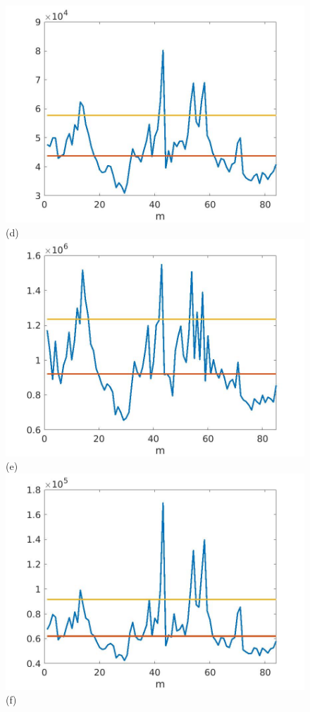 \documentclass[journal]{IEEEtran}
\begin{document}
\begin{figure}[htp!]
\includegraphics[scale=.12]{../../figs/consecdif_J2_euclid_squared_meandev}(d)\\
\includegraphics[scale=.12]{../../figs/J3_euclid_squared_meandev}(e)
\includegraphics[scale=.12]{../../figs/consecdif_J3_euclid_squared_meandev}(f)\\

\end{figure}
\end{document}
